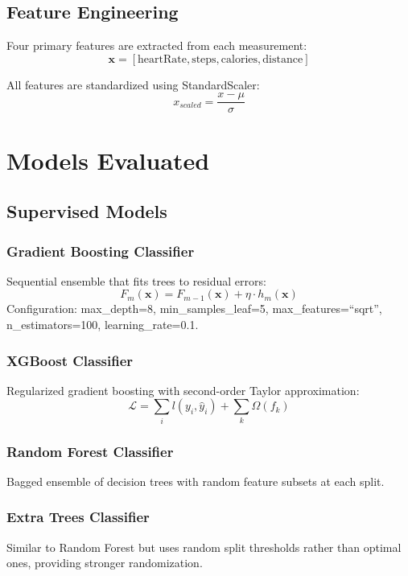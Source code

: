 \documentclass[conference]{IEEEtran}
\begin{document}
\subsection{Feature Engineering}
Four primary features are extracted from each measurement:
\begin{equation}
\mathbf{x} = [\text{heartRate}, \text{steps}, \text{calories}, \text{distance}]
\end{equation}

All features are standardized using StandardScaler:
\begin{equation}
x_{scaled} = \frac{x - \mu}{\sigma}
\end{equation}

\section{Models Evaluated}

\subsection{Supervised Models}

\subsubsection{Gradient Boosting Classifier}
Sequential ensemble that fits trees to residual errors:
\begin{equation}
F_m(\mathbf{x}) = F_{m-1}(\mathbf{x}) + \eta \cdot h_m(\mathbf{x})
\end{equation}
Configuration: max\_depth=8, min\_samples\_leaf=5, max\_features=``sqrt'', n\_estimators=100, learning\_rate=0.1.

\subsubsection{XGBoost Classifier}
Regularized gradient boosting with second-order Taylor approximation:
\begin{equation}
\mathcal{L} = \sum_{i} l(y_i, \hat{y}_i) + \sum_{k} \Omega(f_k)
\end{equation}

\subsubsection{Random Forest Classifier}
Bagged ensemble of decision trees with random feature subsets at each split.

\subsubsection{Extra Trees Classifier}
Similar to Random Forest but uses random split thresholds rather than optimal ones, providing stronger randomization.
\end{document}
